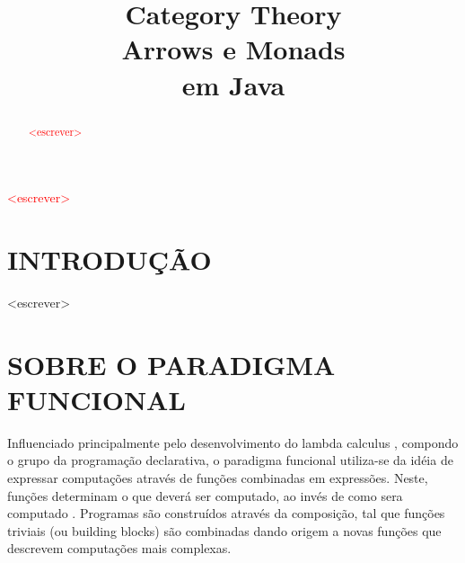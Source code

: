 \documentclass[10pt, conference]{IEEEtran}
\begin{document}
\title { 
	Category Theory \\
	Arrows e Monads \\
	em Java 
}

\author{


	\and	
	
}
					  
\maketitle

\begin{abstract}

\textcolor{red}{<escrever>}

\end{abstract}

\begin{IEEEkeywords}

\textcolor{red}{<escrever>}

\end{IEEEkeywords}

\section{INTRODUÇÃO}
\label{sec:intro}

<escrever>

\section{SOBRE O PARADIGMA FUNCIONAL}
\label{sec:func-para}
Influenciado principalmente pelo desenvolvimento do lambda calculus \cite{hudak1989conception}, compondo o grupo da programação declarativa, o paradigma funcional utiliza-se da idéia de expressar computações através de funções combinadas em expressões. Neste, funções determinam o que deverá ser computado, ao invés de como sera computado \cite{louden2011programming}. Programas são construídos através da composição, tal que funções triviais (ou building blocks) são combinadas dando origem a novas funções que descrevem computações mais complexas.
\end{document}
